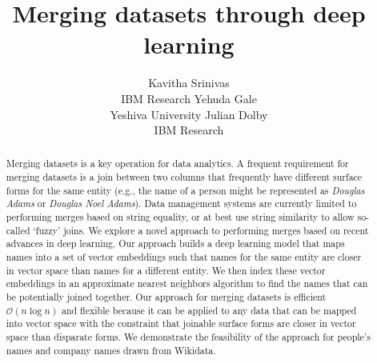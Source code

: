 \documentclass[letterpaper]{article} %
\begin{document}
%
\title{Merging datasets through deep learning}


\author{Kavitha Srinivas \\ IBM Research
\And Yehuda Gale \\ Yeshiva University
\And Julian Dolby \\ IBM Research}


\maketitle
\begin{abstract}
Merging datasets is a key operation for data analytics.  A frequent requirement for merging datasets is a join between two columns that frequently have different surface forms for the same entity (e.g., the name of a person might be represented as \textit{Douglas Adams} or \textit{Douglas Noel Adams}).  Data management systems are currently limited to performing merges based on string equality, or at best use string similarity to allow so-called `fuzzy' joins.  We explore a novel approach to performing merges based on recent advances in deep learning.  Our approach builds a deep learning model that maps names into a set of vector embeddings such that names for the same entity are closer in vector space than names for a different entity.  We then index these vector embeddings in an approximate nearest neighbors algorithm to find the names that can be potentially joined together.  Our approach for merging datasets is efficient $\mathcal{O}(n\log{}n)$ and flexible because it can be applied to any data that can be mapped into vector space with the constraint that joinable surface forms are closer in vector space than disparate forms.  We demonstrate the feasibility of the approach for people's names and company names drawn from Wikidata.
\end{abstract}





  
  
  
\end{document}
